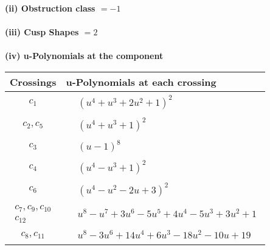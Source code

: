 \documentclass[1p]{elsarticle_modified}
\theoremstyle{definition}
\begin{document}
\flushleft \textbf{(ii) Obstruction class $= -1$}\\~\\
\flushleft \textbf{(iii) Cusp Shapes $= 2$}\\~\\
\newpage\renewcommand{\arraystretch}{1}
\flushleft \textbf{(iv) u-Polynomials at the component}\newline \\
\begin{tabular}{m{50pt}|m{274pt}}
Crossings & \hspace{64pt}u-Polynomials at each crossing \\
\hline $$\begin{aligned}c_{1}\end{aligned}$$&$\begin{aligned}
&(u^4+u^3+2 u^2+1)^2
\end{aligned}$\\
\hline $$\begin{aligned}c_{2},c_{5}\end{aligned}$$&$\begin{aligned}
&(u^4+u^3+1)^2
\end{aligned}$\\
\hline $$\begin{aligned}c_{3}\end{aligned}$$&$\begin{aligned}
&(u-1)^8
\end{aligned}$\\
\hline $$\begin{aligned}c_{4}\end{aligned}$$&$\begin{aligned}
&(u^4- u^3+1)^2
\end{aligned}$\\
\hline $$\begin{aligned}c_{6}\end{aligned}$$&$\begin{aligned}
&(u^4- u^2-2 u+3)^2
\end{aligned}$\\
\hline $$\begin{aligned}c_{7},c_{9},c_{10}\\c_{12}\end{aligned}$$&$\begin{aligned}
&u^8- u^7+3 u^6-5 u^5+4 u^4-5 u^3+3 u^2+1
\end{aligned}$\\
\hline $$\begin{aligned}c_{8},c_{11}\end{aligned}$$&$\begin{aligned}
&u^8-3 u^6+14 u^4+6 u^3-18 u^2-10 u+19
\end{aligned}$\\
\hline
\end{tabular}\\~\\
\end{document}
